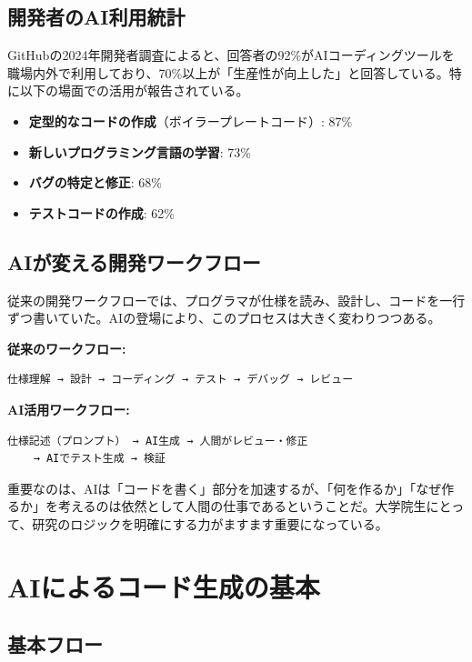 \subsection{開発者のAI利用統計}

GitHubの2024年開発者調査によると、回答者の92\%がAIコーディングツールを職場内外で利用しており、70\%以上が「生産性が向上した」と回答している。特に以下の場面での活用が報告されている。

\begin{itemize}
\item \textbf{定型的なコードの作成}（ボイラープレートコード）: 87\%
\item \textbf{新しいプログラミング言語の学習}: 73\%
\item \textbf{バグの特定と修正}: 68\%
\item \textbf{テストコードの作成}: 62\%
\end{itemize}

\subsection{AIが変える開発ワークフロー}

従来の開発ワークフローでは、プログラマが仕様を読み、設計し、コードを一行ずつ書いていた。AIの登場により、このプロセスは大きく変わりつつある。

\textbf{従来のワークフロー:}
\begin{verbatim}
仕様理解 → 設計 → コーディング → テスト → デバッグ → レビュー
\end{verbatim}

\textbf{AI活用ワークフロー:}
\begin{verbatim}
仕様記述（プロンプト） → AI生成 → 人間がレビュー・修正
    → AIでテスト生成 → 検証
\end{verbatim}

重要なのは、AIは「コードを書く」部分を加速するが、「何を作るか」「なぜ作るか」を考えるのは依然として人間の仕事であるということだ。大学院生にとって、研究のロジックを明確にする力がますます重要になっている。

\section{AIによるコード生成の基本}
\label{sec:6.2}

\subsection{基本フロー}

